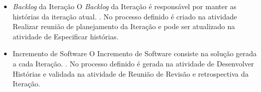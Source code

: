 \begin{itemize}
  \item \textit{Backlog} da Iteração
        \subitem O \textit{Backlog} da Iteração é responsável por manter as histórias da iteração atual. \cite{safe}.
        No processo definido é criado na atividade Realizar reunião de planejamento 
      da Iteração e pode ser atualizado na atividade de Especificar histórias.
  
  \item Incremento de Software
      \subitem O Incremento de Software consiste na solução gerada a cada Iteração. \cite{scrum}. No processo definido é gerada na atividade de Desenvolver Histórias e validada na 
      atividade de Reunião de Revisão e retrospectiva da Iteração.
\end{itemize}
